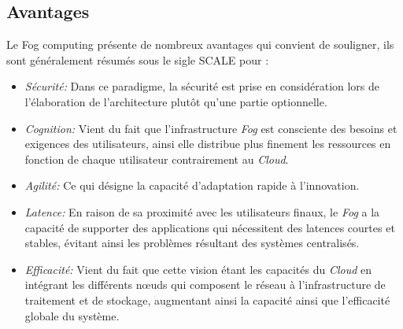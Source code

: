 \subsection{Avantages}
Le Fog computing présente de nombreux avantages qui convient de souligner, ils sont généralement résumés sous le sigle SCALE pour :
\begin{itemize}
  \item \emph{Sécurité:} Dans ce paradigme, la sécurité est prise en considération lors de l'élaboration de l'architecture plutôt qu'une partie optionnelle.
  \item \emph{Cognition:} Vient du fait que l'infrastructure \emph{Fog} est consciente des besoins et exigences des utilisateurs, ainsi elle distribue plus finement les ressources en fonction de chaque utilisateur contrairement au \emph{Cloud}.
  \item \emph{Agilité:} Ce qui désigne la capacité d'adaptation rapide à l'innovation.
  \item \emph{Latence:} En raison de sa proximité avec les utilisateurs finaux, le \emph{Fog} a la capacité de supporter des applications qui nécessitent des latences courtes et stables, évitant ainsi les problèmes résultant des systèmes centralisés.
  \item \emph{Efficacité:} Vient du fait que cette vision étant les capacités du \emph{Cloud} en intégrant
  les différents nœuds qui composent le réseau à l'infrastructure de traitement et de stockage, augmentant ainsi la capacité ainsi que l'efficacité globale du système.
\end{itemize}
